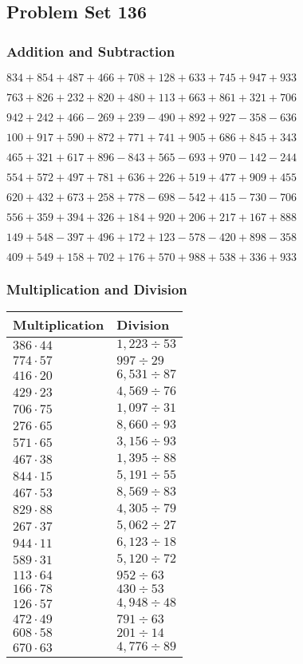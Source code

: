 \hypertarget{problem-set-136}{%
\subsection{Problem Set 136}\label{problem-set-136}}

\hypertarget{addition-and-subtraction}{%
\subsubsection{Addition and
Subtraction}\label{addition-and-subtraction}}

\(834 +854 +487 +466 +708 +128 +633 +745 +947 +933\)

\(763 +826 +232 +820 +480 +113 +663 +861 +321 +706\)

\(942 +242 +466 - 269 +239 - 490 +892 +927 - 358 - 636\)

\(100 +917 +590 +872 +771 +741 +905 +686 +845 +343\)

\(465 +321 +617 +896 - 843 +565 - 693 +970 - 142 - 244\)

\(554 +572 +497 +781 +636 +226 +519 +477 +909 +455\)

\(620 +432 +673 +258 +778 - 698 - 542 +415 - 730 - 706\)

\(556 +359 +394 +326 +184 +920 +206 +217 +167 +888\)

\(149 +548 - 397 +496 +172 +123 - 578 - 420 +898 - 358\)

\(409 +549 +158 +702 +176 +570 +988 +538 +336 +933\)

\hypertarget{multiplication-and-division}{%
\subsubsection{Multiplication and
Division}\label{multiplication-and-division}}

\begin{longtable}[]{@{}ll@{}}
\toprule
Multiplication & Division\tabularnewline
\midrule
\endhead
\(386 \cdot 44\) & \(1,223÷53\)\tabularnewline
\(774 \cdot 57\) & \(997÷29\)\tabularnewline
\(416 \cdot 20\) & \(6,531÷87\)\tabularnewline
\(429 \cdot 23\) & \(4,569÷76\)\tabularnewline
\(706 \cdot 75\) & \(1,097÷31\)\tabularnewline
\(276 \cdot 65\) & \(8,660÷93\)\tabularnewline
\(571 \cdot 65\) & \(3,156÷93\)\tabularnewline
\(467 \cdot 38\) & \(1,395÷88\)\tabularnewline
\(844 \cdot 15\) & \(5,191÷55\)\tabularnewline
\(467 \cdot 53\) & \(8,569÷83\)\tabularnewline
\(829 \cdot 88\) & \(4,305÷79\)\tabularnewline
\(267 \cdot 37\) & \(5,062÷27\)\tabularnewline
\(944 \cdot 11\) & \(6,123÷18\)\tabularnewline
\(589 \cdot 31\) & \(5,120÷72\)\tabularnewline
\(113 \cdot 64\) & \(952÷63\)\tabularnewline
\(166 \cdot 78\) & \(430÷53\)\tabularnewline
\(126 \cdot 57\) & \(4,948÷48\)\tabularnewline
\(472 \cdot 49\) & \(791÷63\)\tabularnewline
\(608 \cdot 58\) & \(201÷14\)\tabularnewline
\(670 \cdot 63\) & \(4,776÷89\)\tabularnewline
\bottomrule
\end{longtable}
